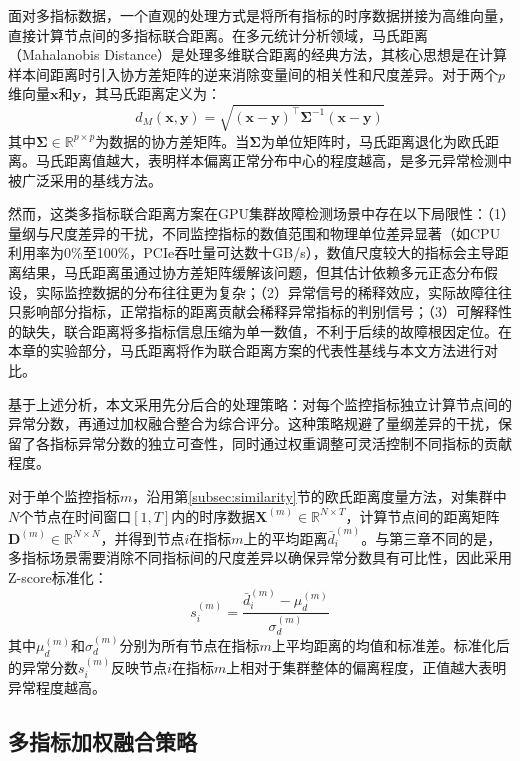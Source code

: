 面对多指标数据，一个直观的处理方式是将所有指标的时序数据拼接为高维向量，直接计算节点间的多指标联合距离。在多元统计分析领域，马氏距离（Mahalanobis Distance）\cite{mahalanobis1936}是处理多维联合距离的经典方法，其核心思想是在计算样本间距离时引入协方差矩阵的逆来消除变量间的相关性和尺度差异。对于两个$p$维向量$\mathbf{x}$和$\mathbf{y}$，其马氏距离定义为：
\begin{equation}
    d_M(\mathbf{x}, \mathbf{y}) = \sqrt{(\mathbf{x} - \mathbf{y})^\top \mathbf{\Sigma}^{-1} (\mathbf{x} - \mathbf{y})}
    \label{eq:mahalanobis}
\end{equation}
其中$\mathbf{\Sigma} \in \mathbb{R}^{p \times p}$为数据的协方差矩阵。当$\mathbf{\Sigma}$为单位矩阵时，马氏距离退化为欧氏距离。马氏距离值越大，表明样本偏离正常分布中心的程度越高，是多元异常检测中被广泛采用的基线方法。

然而，这类多指标联合距离方案在GPU集群故障检测场景中存在以下局限性：（1）量纲与尺度差异的干扰，不同监控指标的数值范围和物理单位差异显著（如CPU利用率为0\%至100\%，PCIe吞吐量可达数十GB/s），数值尺度较大的指标会主导距离结果，马氏距离虽通过协方差矩阵缓解该问题，但其估计依赖多元正态分布假设，实际监控数据的分布往往更为复杂；（2）异常信号的稀释效应，实际故障往往只影响部分指标，正常指标的距离贡献会稀释异常指标的判别信号；（3）可解释性的缺失，联合距离将多指标信息压缩为单一数值，不利于后续的故障根因定位。在本章的实验部分，马氏距离将作为联合距离方案的代表性基线与本文方法进行对比。

基于上述分析，本文采用先分后合的处理策略：对每个监控指标独立计算节点间的异常分数，再通过加权融合整合为综合评分。这种策略规避了量纲差异的干扰，保留了各指标异常分数的独立可查性，同时通过权重调整可灵活控制不同指标的贡献程度。

对于单个监控指标$m$，沿用第\ref{subsec:similarity}节的欧氏距离度量方法，对集群中$N$个节点在时间窗口$[1,T]$内的时序数据$\mathbf{X}^{(m)} \in \mathbb{R}^{N \times T}$，计算节点间的距离矩阵$\mathbf{D}^{(m)} \in \mathbb{R}^{N \times N}$，并得到节点$i$在指标$m$上的平均距离$\bar{d}_i^{(m)}$。与第三章不同的是，多指标场景需要消除不同指标间的尺度差异以确保异常分数具有可比性，因此采用Z-score标准化：
\begin{equation}
    s_i^{(m)} = \frac{\bar{d}_i^{(m)} - \mu_d^{(m)}}{\sigma_d^{(m)}}
\end{equation}
其中$\mu_d^{(m)}$和$\sigma_d^{(m)}$分别为所有节点在指标$m$上平均距离的均值和标准差。标准化后的异常分数$s_i^{(m)}$反映节点$i$在指标$m$上相对于集群整体的偏离程度，正值越大表明异常程度越高。

\subsection{多指标加权融合策略}

